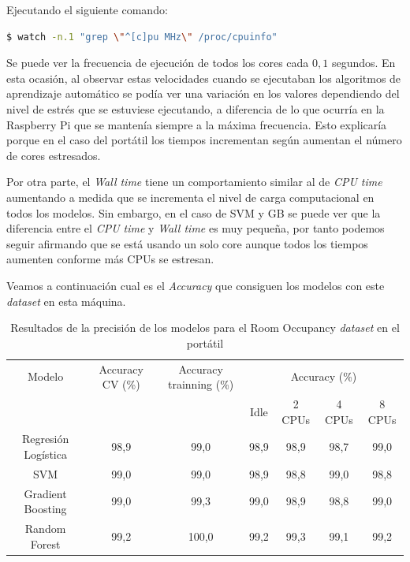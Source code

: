 \documentclass[a4paper, 12pt]{book}
\begin{document}
Ejecutando el siguiente comando: 

\begin{lstlisting}[language=bash, showstringspaces=false]
  $ watch -n.1 "grep \"^[c]pu MHz\" /proc/cpuinfo"
\end{lstlisting}

Se puede ver la frecuencia de ejecución de todos los cores cada $0,1$ segundos. En esta ocasión, al observar estas velocidades cuando se ejecutaban los algoritmos de aprendizaje automático se podía ver una variación en los valores dependiendo del nivel de estrés que se estuviese ejecutando, a diferencia de lo que ocurría en la Raspberry Pi que se mantenía siempre a la máxima frecuencia. Esto explicaría porque en el caso del portátil los tiempos incrementan según aumentan el número de cores estresados. 

Por otra parte, el \textit{Wall time} tiene un comportamiento similar al de \textit{CPU time} aumentando a medida que se incrementa el nivel de carga computacional en todos los modelos. Sin embargo, en el caso de SVM y GB se puede ver que la diferencia entre el \textit{CPU time} y \textit{Wall time} es muy pequeña, por tanto podemos seguir afirmando que se está usando un solo core aunque todos los tiempos aumenten conforme más CPUs se estresan.

Veamos a continuación cual es el \textit{Accuracy} que consiguen los modelos con este \textit{dataset} en esta máquina.\\
\begin{table}[htb]
\renewcommand{\arraystretch}{1.5}
\begin{adjustbox}{width=\textwidth}
\centering
    \begin{tabular}{c  c  c  c  c  c  c}
    \hline
    Modelo & Accuracy CV (\%) & Accuracy trainning (\%) & \multicolumn{4}{c}{Accuracy (\%)} \\
    \cline{4-7}
      &  &   &  Idle & 2 CPUs & 4 CPUs & 8 CPUs \\
     \hline
     Regresión Logística & 98,9 & 99,0 & 98,9 & 98,9 & 98,7 & 99,0\\
     SVM & 99,0 & 99,0 & 98,9 & 98,8 & 99,0 & 98,8\\
     Gradient Boosting & 99,0 & 99,3 & 99,0 & 98,9 & 98,8 & 99,0\\
     Random Forest & 99,2 & 100,0 & 99,2 & 99,3 & 99,1 & 99,2\\
    \hline
    \end{tabular}
\end{adjustbox}
\caption{Resultados de la precisión de los modelos para el Room Occupancy \textit{dataset} en el portátil}
\label{tab:acc_Occpc}
\end{table}
\end{document}
